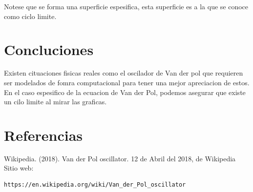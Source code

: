\documentclass[a4paper]{article}
\begin{document}
\newpage

Notese que se forma una superficie espesifica, esta superficie es a la que se conoce como ciclo limite.

\section{Concluciones}

Existen cituaciones fisicas reales como el oscilador de Van der pol que requieren ser modelados de fomra computacional para tener una mejor apreciacion de estos. En el caso espesifico de la ecuacion de Van der Pol, podemos asegurar que existe un cilo limite al mirar las graficas.

\section{Referencias}

Wikipedia. (2018). Van der Pol oscillator. 12 de Abril del 2018, de Wikipedia Sitio web: 
\begin{verbatim}
https://en.wikipedia.org/wiki/Van_der_Pol_oscillator
\end{verbatim}
\end{document}
